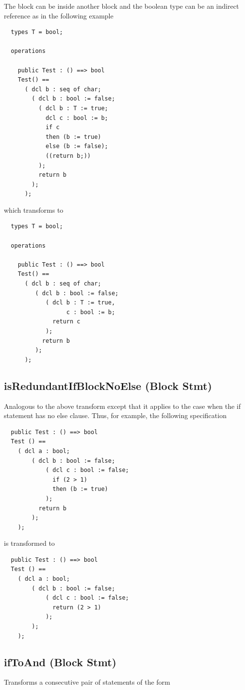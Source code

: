 \documentclass[\pformat,12pt]{article}
\begin{document}
The block can be inside another block and the boolean type can be an
indirect reference as in the following example

\begin{verbatim}
  types T = bool;

  operations

    public Test : () ==> bool  
    Test() ==
      ( dcl b : seq of char;
        ( dcl b : bool := false;
          ( dcl b : T := true;
            dcl c : bool := b;
            if c
            then (b := true)
            else (b := false);
            ((return b;))
          );
          return b
        );
      );
\end{verbatim}

which transforms to

\begin{verbatim}
  types T = bool;

  operations

    public Test : () ==> bool  
    Test() ==
      ( dcl b : seq of char;
         ( dcl b : bool := false;
            ( dcl b : T := true,
                  c : bool := b;
              return c
            );
           return b 
         ); 
      );
\end{verbatim}


\subsection{isRedundantIfBlockNoElse (Block Stmt)}
  Analogous to the above transform except that it applies to the case
  when the if statement has no else clause. Thus, for example, the
  following specification

\begin{verbatim}
  public Test : () ==> bool  
  Test () ==
    ( dcl a : bool;
        ( dcl b : bool := false;
            ( dcl c : bool := false;
              if (2 > 1)
              then (b := true)
            );          
          return b
        );
    );
\end{verbatim}

is transformed to

\begin{verbatim}
  public Test : () ==> bool  
  Test () ==
    ( dcl a : bool;
        ( dcl b : bool := false;
            ( dcl c : bool := false;
              return (2 > 1)
            );
        );
    );
\end{verbatim}

\subsection{ifToAnd (Block Stmt)}
  Transforms a consecutive pair of statements of the form
\end{document}
